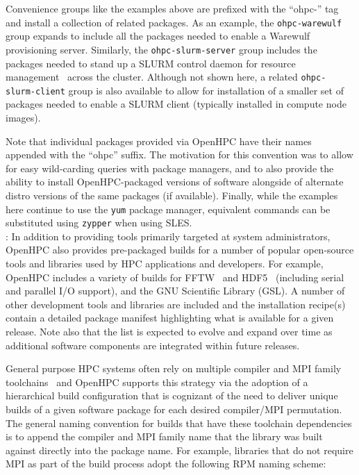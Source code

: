 \documentclass{sig-alternate-05-2015}
\begin{document}
Convenience groups like the examples above are prefixed with the ``ohpc-'' tag
and install a collection of related packages. As an example, the
\texttt{ohpc-warewulf} group expands to include all the packages needed to
enable a Warewulf provisioning server. Similarly, the
\texttt{ohpc-slurm-server} group includes the packages needed to stand up a
SLURM control daemon for resource management~\cite{Jette02slurm:simple} across
the cluster.  Although not shown here, a related \texttt{ohpc-slurm-client}
group is also available to allow for installation of a smaller set of packages
needed to enable a SLURM client (typically installed in compute node images).

Note that individual packages provided via OpenHPC have their names appended
with the ``ohpc'' suffix.  The motivation for this convention was to allow for
easy wild-carding queries with package managers, and to also provide the
ability to install OpenHPC-packaged versions of software alongside of alternate
distro versions of the same packages (if available).  Finally, while the
examples here continue to use the \texttt{yum} package manager, equivalent
commands can be substituted using \texttt{zypper} when using SLES.  \\

: In addition to providing tools primarily
targeted at system administrators, OpenHPC also provides pre-packaged builds
for a number of popular open-source tools and libraries used by HPC
applications and developers. For example, OpenHPC includes a variety of builds
for FFTW~\cite{FFTW05} and HDF5~\cite{hdf5_url} (including serial and
parallel I/O support), and the GNU Scientific Library (GSL). A number of other
development tools and libraries are included and the installation recipe(s)
contain a detailed package manifest highlighting what is available for a given
release. Note also that the list is expected to evolve
and expand over time as additional software components are integrated within
future releases.

General purpose HPC systems often rely on multiple compiler and MPI family
toolchains~\cite{tacc_sc_best_practices:2011} and OpenHPC supports this
strategy via the adoption of a hierarchical build configuration that is
cognizant of the need to deliver unique builds of a given software package for
each desired compiler/MPI permutation.
The general naming convention for builds that have these toolchain dependencies 
is to append the compiler and MPI family name that the
library was built against directly into the package name. For example,
libraries that do not require MPI as part of the build process adopt the
following RPM naming scheme: \\
\end{document}
